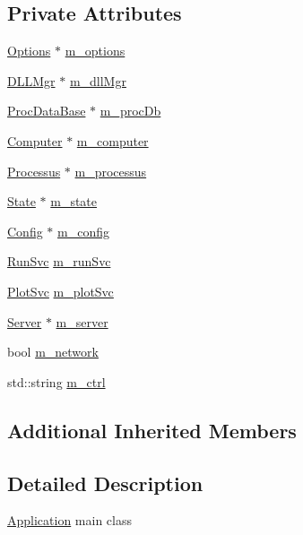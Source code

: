 \subsection*{Private Attributes}
\begin{DoxyCompactItemize}
\item 
\hyperlink{classOptions}{Options} $\ast$ \hyperlink{classApplication_a3b0c74bf1ba99a5042990e3fefaa8963}{m\+\_\+options}
\item 
\hyperlink{classDLLMgr}{D\+L\+L\+Mgr} $\ast$ \hyperlink{classApplication_a66b06cbeb824fe00ecd11499fcf01c55}{m\+\_\+dll\+Mgr}
\item 
\hyperlink{classProcDataBase}{Proc\+Data\+Base} $\ast$ \hyperlink{classApplication_af030cefeb69586f01e965606d5dd8919}{m\+\_\+proc\+Db}
\item 
\hyperlink{classComputer}{Computer} $\ast$ \hyperlink{classApplication_a17c9fd27b6abbc18abb6d5de5d7648ef}{m\+\_\+computer}
\item 
\hyperlink{classProcessus}{Processus} $\ast$ \hyperlink{classApplication_ab5eb4b3d3bef5ab9fce9c69401ce5786}{m\+\_\+processus}
\item 
\hyperlink{classState}{State} $\ast$ \hyperlink{classApplication_a0ef9832e2d286716e597a1ff21ffcab4}{m\+\_\+state}
\item 
\hyperlink{classConfig}{Config} $\ast$ \hyperlink{classApplication_ae05f3e253ea871a194c3d30fd1d3b0c3}{m\+\_\+config}
\item 
\hyperlink{Application_8h_a59643f52f9391fa83f137814aaae27ef}{Run\+Svc} \hyperlink{classApplication_ad2c061af424280151c86b9b56d9724d3}{m\+\_\+run\+Svc}
\item 
\hyperlink{Application_8h_abaa10d33ca2837dfcf8ba9bff40cdbb6}{Plot\+Svc} \hyperlink{classApplication_a30d5600ea5e4f36b14f25f903ee3256e}{m\+\_\+plot\+Svc}
\item 
\hyperlink{classServer}{Server} $\ast$ \hyperlink{classApplication_a5e6085b0f322d5036177b16113a75b56}{m\+\_\+server}
\item 
bool \hyperlink{classApplication_a7dc2bb72356cd9186eaad49eb506995a}{m\+\_\+network}
\item 
std\+::string \hyperlink{classApplication_aa371ed989ed34038df400c4d1b41b37f}{m\+\_\+ctrl}
\end{DoxyCompactItemize}
\subsection*{Additional Inherited Members}


\subsection{Detailed Description}
\hyperlink{classApplication}{Application} main class

